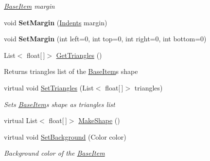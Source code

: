 \begin{DoxyCompactItemize}
\begin{DoxyCompactList}\small\item\em \mbox{\hyperlink{class_space_v_i_l_1_1_base_item}{Base\+Item}} margin \end{DoxyCompactList}\item 
\mbox{\label{class_space_v_i_l_1_1_base_item_a3fe9a70fe60c50802c6cc6f9593d9409}} 
void {\bfseries Set\+Margin} (\mbox{\hyperlink{struct_space_v_i_l_1_1_decorations_1_1_indents}{Indents}} margin)
\item 
\mbox{\label{class_space_v_i_l_1_1_base_item_a63ee32be1841607604464a2cc247e5be}} 
void {\bfseries Set\+Margin} (int left=0, int top=0, int right=0, int bottom=0)
\item 
\mbox{\label{class_space_v_i_l_1_1_base_item_a196eedcb995f3d4fd3f0c231c47b2b9e}} 
List$<$ float\mbox{[}$\,$\mbox{]}$>$ \mbox{\hyperlink{class_space_v_i_l_1_1_base_item_a196eedcb995f3d4fd3f0c231c47b2b9e}{Get\+Triangles}} ()
\begin{DoxyCompactList}\small\item\em \begin{DoxyReturn}{Returns}
triangles list of the \mbox{\hyperlink{class_space_v_i_l_1_1_base_item}{Base\+Item}}\textquotesingle{}s shape
\end{DoxyReturn}
\end{DoxyCompactList}\item 
virtual void \mbox{\hyperlink{class_space_v_i_l_1_1_base_item_abce4d28de70cae71fde1612342e519a4}{Set\+Triangles}} (List$<$ float\mbox{[}$\,$\mbox{]}$>$ triangles)
\begin{DoxyCompactList}\small\item\em Sets \mbox{\hyperlink{class_space_v_i_l_1_1_base_item}{Base\+Item}}\textquotesingle{}s shape as triangles list \end{DoxyCompactList}\item 
virtual List$<$ float\mbox{[}$\,$\mbox{]}$>$ \mbox{\hyperlink{class_space_v_i_l_1_1_base_item_ac111d3d8cef36f406aa11862cefab9e2}{Make\+Shape}} ()
\item 
virtual void \mbox{\hyperlink{class_space_v_i_l_1_1_base_item_a9ac74dbeeaedbc9dc13edbad28ee1d8c}{Set\+Background}} (Color color)
\begin{DoxyCompactList}\small\item\em Background color of the \mbox{\hyperlink{class_space_v_i_l_1_1_base_item}{Base\+Item}} \end{DoxyCompactList}\item 

\end{DoxyCompactItemize}
